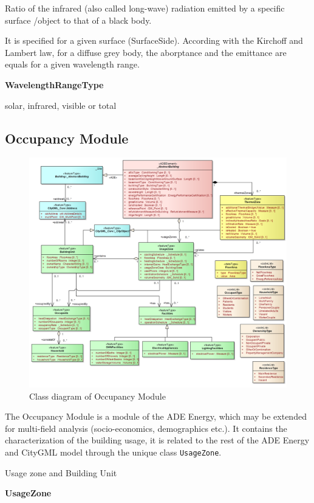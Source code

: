 \documentclass[a4paper,12pt]{article}
\begin{document}
Ratio of the infrared (also called long-wave) radiation emitted by a
specific surface /object to that of a black body.

It is specified for a given surface (SurfaceSide). According with the
Kirchoff and Lambert law, for a diffuse grey body, the aborptance and
the emittance are equals for a given wavelength range.

\textbf{WavelengthRangeType}

solar, infrared, visible or total

\subsection{Occupancy Module}\label{occupancy-module}

\begin{figure}[htbp]
\centering
\includegraphics{fig/class_occupancy.png}
\caption{Class diagram of Occupancy Module}
\end{figure}

The Occupancy Module is a module of the ADE Energy, which may be
extended for multi-field analysis (socio-economics, demographics etc.).
It contains the characterization of the building usage, it is related to
the rest of the ADE Energy and CityGML model through the unique class
\texttt{UsageZone}.

Usage zone and Building Unit

\textbf{UsageZone}
\end{document}
